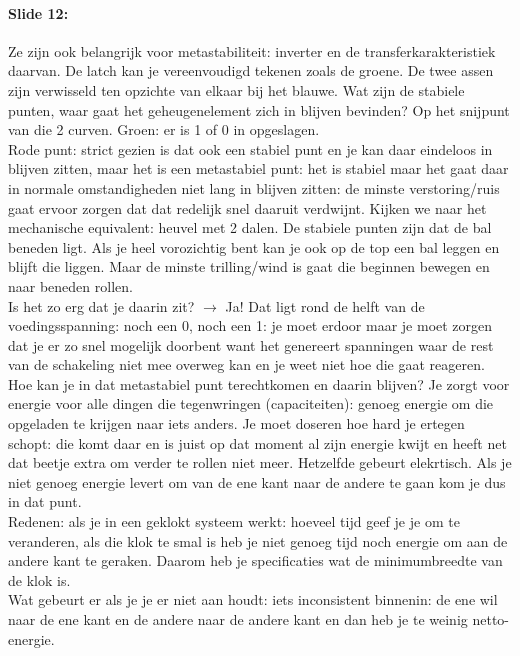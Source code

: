 \documentclass[10pt,a4paper]{book}
\begin{document}
\paragraph{Slide 12:} Ze zijn ook belangrijk voor metastabiliteit: inverter en de transferkarakteristiek daarvan. De latch kan je vereenvoudigd tekenen zoals de groene. De twee assen zijn verwisseld ten opzichte van elkaar bij het blauwe. Wat zijn de stabiele punten, waar gaat het geheugenelement zich in blijven bevinden? Op het snijpunt van die 2 curven. Groen: er is 1 of 0 in opgeslagen.\\
Rode punt: strict gezien is dat ook een stabiel punt en je kan daar eindeloos in blijven zitten, maar het is een metastabiel punt: het is stabiel maar het gaat daar in normale omstandigheden niet lang in blijven zitten: de minste verstoring/ruis gaat ervoor zorgen dat dat redelijk snel daaruit verdwijnt. Kijken we naar het mechanische equivalent: heuvel met 2 dalen. De stabiele punten zijn dat de bal beneden ligt. Als je heel vorozichtig bent kan je ook op de top een bal leggen en blijft die liggen. Maar de minste trilling/wind is gaat die beginnen bewegen en naar beneden rollen.\\
Is het zo erg dat je daarin zit? $\rightarrow$ Ja! Dat ligt rond de helft van de voedingsspanning: noch een 0, noch een 1: je moet erdoor maar je moet zorgen dat je er zo snel mogelijk doorbent want het genereert spanningen waar de rest van de schakeling niet mee overweg kan en je weet niet hoe die gaat reageren.\\
Hoe kan je in dat metastabiel punt terechtkomen en daarin blijven? Je zorgt voor energie voor alle dingen die tegenwringen (capaciteiten): genoeg energie om die opgeladen te krijgen naar iets anders. Je moet doseren hoe hard je ertegen schopt: die komt daar en is juist op dat moment al zijn energie kwijt en heeft net dat beetje extra om verder te rollen niet meer. Hetzelfde gebeurt elekrtisch. Als je niet genoeg energie levert om van de ene kant naar de andere te gaan kom je dus in dat punt.\\
Redenen: als je in een geklokt systeem werkt: hoeveel tijd geef je je om te veranderen, als die klok te smal is heb je niet genoeg tijd noch energie om aan de andere kant te geraken. Daarom heb je specificaties wat de minimumbreedte van de klok is.\\
Wat gebeurt er als je je er niet aan houdt: iets inconsistent binnenin: de ene wil naar de ene kant en de andere naar de andere kant en dan heb je te weinig netto-energie.\\
\end{document}

